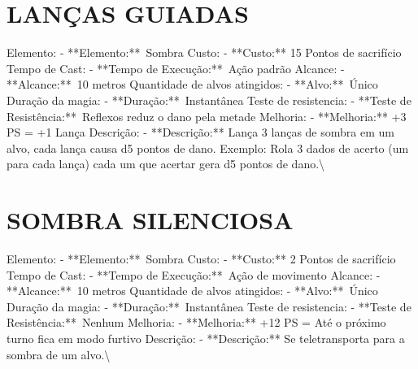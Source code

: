 \documentclass{article}%
\begin{document}
\section{LANÇAS GUIADAS}%
\label{sec:LANASGUIADAS}%
Elemento: {-} **Elemento:**~Sombra\newline%
Custo: {-} **Custo:** 15 Pontos de sacrifício\newline%
Tempo de Cast: {-} **Tempo de Execução:**~Ação padrão\newline%
Alcance: {-} **Alcance:**~10 metros\newline%
Quantidade de alvos atingidos: {-} **Alvo:**~Único\newline%
Duração da magia: {-} **Duração:**~Instantânea\newline%
Teste de resistencia: {-} **Teste de Resistência:**~Reflexos reduz o dano pela metade\newline%
Melhoria: {-} **Melhoria:** +3 PS = +1 Lança\newline%
Descrição: {-} **Descrição:** Lança 3 lanças de sombra em um alvo, cada lança causa d5 pontos de dano. Exemplo: Rola 3 dados de acerto (um para cada lança) cada um que acertar gera d5 pontos de dano.\textbackslash{}

%
\section{SOMBRA SILENCIOSA}%
\label{sec:SOMBRASILENCIOSA}%
Elemento: {-} **Elemento:**~Sombra\newline%
Custo: {-} **Custo:** 2 Pontos de sacrifício\newline%
Tempo de Cast: {-} **Tempo de Execução:**~Ação de movimento\newline%
Alcance: {-} **Alcance:**~10 metros\newline%
Quantidade de alvos atingidos: {-} **Alvo:**~Único\newline%
Duração da magia: {-} **Duração:**~Instantânea\newline%
Teste de resistencia: {-} **Teste de Resistência:**~Nenhum\newline%
Melhoria: {-} **Melhoria:** +12 PS = Até o próximo turno fica em modo furtivo\newline%
Descrição: {-} **Descrição:** Se teletransporta para a sombra de um alvo.\textbackslash{}

%
\end{document}
